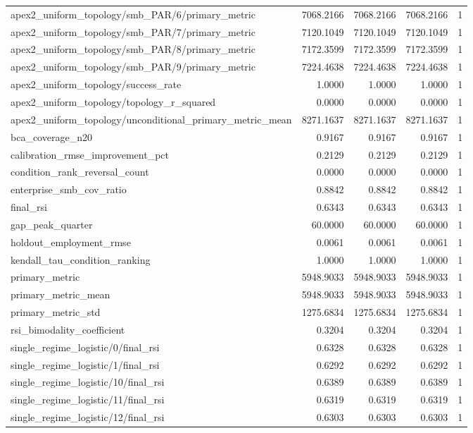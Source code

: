 \begin{table}[h]
\begin{tabular}{lrrrr}
apex2_uniform_topology/smb_PAR/6/primary_metric & 7068.2166 & 7068.2166 & 7068.2166 & 1 \\
apex2_uniform_topology/smb_PAR/7/primary_metric & 7120.1049 & 7120.1049 & 7120.1049 & 1 \\
apex2_uniform_topology/smb_PAR/8/primary_metric & 7172.3599 & 7172.3599 & 7172.3599 & 1 \\
apex2_uniform_topology/smb_PAR/9/primary_metric & 7224.4638 & 7224.4638 & 7224.4638 & 1 \\
apex2_uniform_topology/success_rate & 1.0000 & 1.0000 & 1.0000 & 1 \\
apex2_uniform_topology/topology_r_squared & 0.0000 & 0.0000 & 0.0000 & 1 \\
apex2_uniform_topology/unconditional_primary_metric_mean & 8271.1637 & 8271.1637 & 8271.1637 & 1 \\
bca_coverage_n20 & 0.9167 & 0.9167 & 0.9167 & 1 \\
calibration_rmse_improvement_pct & 0.2129 & 0.2129 & 0.2129 & 1 \\
condition_rank_reversal_count & 0.0000 & 0.0000 & 0.0000 & 1 \\
enterprise_smb_cov_ratio & 0.8842 & 0.8842 & 0.8842 & 1 \\
final_rsi & 0.6343 & 0.6343 & 0.6343 & 1 \\
gap_peak_quarter & 60.0000 & 60.0000 & 60.0000 & 1 \\
holdout_employment_rmse & 0.0061 & 0.0061 & 0.0061 & 1 \\
kendall_tau_condition_ranking & 1.0000 & 1.0000 & 1.0000 & 1 \\
primary_metric & 5948.9033 & 5948.9033 & 5948.9033 & 1 \\
primary_metric_mean & 5948.9033 & 5948.9033 & 5948.9033 & 1 \\
primary_metric_std & 1275.6834 & 1275.6834 & 1275.6834 & 1 \\
rsi_bimodality_coefficient & 0.3204 & 0.3204 & 0.3204 & 1 \\
single_regime_logistic/0/final_rsi & 0.6328 & 0.6328 & 0.6328 & 1 \\
single_regime_logistic/1/final_rsi & 0.6292 & 0.6292 & 0.6292 & 1 \\
single_regime_logistic/10/final_rsi & 0.6389 & 0.6389 & 0.6389 & 1 \\
single_regime_logistic/11/final_rsi & 0.6319 & 0.6319 & 0.6319 & 1 \\
single_regime_logistic/12/final_rsi & 0.6303 & 0.6303 & 0.6303 & 1 \\

\end{tabular}
\end{table}
